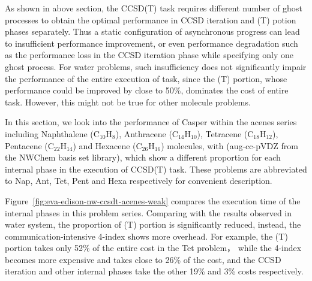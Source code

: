 As shown in above section, the CCSD(T) task requires different number of
ghost processes to obtain the optimal performance in CCSD iteration and (T)
potion phases separately. Thus a static configuration of asynchronous
progress can lead to insufficient performance improvement,  or even
performance degradation such as the performance loss in the CCSD iteration
phase while specifying only one ghost process.
For water problems, such insufficiency does not significantly
impair the performance of the entire execution of task, since the (T)
portion, whose performance could be improved by close to 50\%, dominates
the cost of entire task. However, this might not be true for other molecule
problems.

In this section, we look into the performance of Casper within the
acenes series including Naphthalene (C$_{10}$H$_{8}$),
Anthracene (C$_{14}$H$_{10}$), Tetracene (C$_{18}$H$_{12}$),
Pentacene (C$_{22}$H$_{14}$) and Hexacene (C$_{26}$H$_{16}$) molecules,
with  (aug-cc-pVDZ from the NWChem basis set
library), which show a different proportion for each internal phase in the
execution of CCSD(T) task. These problems are abbreviated to Nap, Ant, Tet,
Pent and Hexa respectively for convenient description.

Figure~\ref{fig:eva-edison-nw-ccsdt-acenes-weak} compares the execution
time of the internal phases in this problem series.
Comparing with the results observed in water system, the proportion of
(T) portion is significantly reduced, instead, the communication-intensive
4-index shows more overhead. For example, the (T) portion takes only 52\%
of the entire cost in the Tet problem， while the 4-index becomes more
expensive and takes close to 26\% of the cost, and the CCSD iteration
and other internal phases take the other 19\% and 3\% costs respectively.


